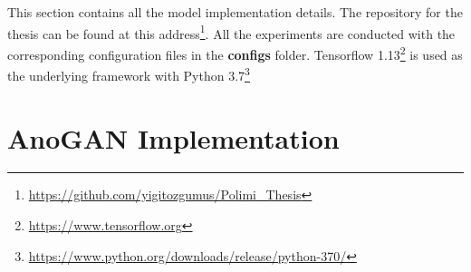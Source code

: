 
\begingroup

This section contains all the model implementation details. The repository for the thesis 
can be found at this address\footnote{\href{https://github.com/yigitozgumus/Polimi\_Thesis}{https://github.com/yigitozgumus/Polimi\_Thesis}}. All the
experiments are conducted with the corresponding configuration files in the \textbf{configs} folder.
Tensorflow 1.13\footnote{\href{https://www.tensorflow.org}{https://www.tensorflow.org}} is 
used as the underlying framework with Python 3.7\footnote{\href{https://www.python.org/downloads/release/python-370/}{https://www.python.org/downloads/release/python-370/}}

\section{AnoGAN Implementation}
\label{app:anogan}

